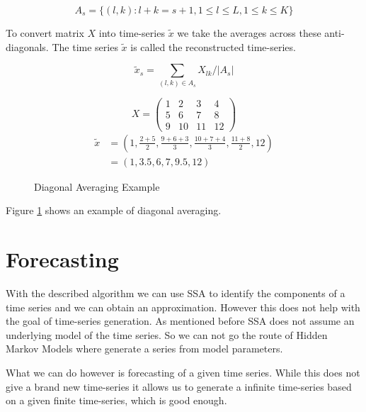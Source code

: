 \begin{equation}
A_{s}=\{(l, k): l+k=s+1,1 \leq l \leq L, 1 \leq k \leq K\}
\end{equation}

To convert matrix $X$ into time-series $\tilde{x}$ we take the averages across these anti-diagonals. The time series $\tilde{x}$ is called the reconstructed time-series. 

\begin{equation}
    \widetilde{x}_{s}=\sum_{(l, k) \in A_{s}} X_{l k} /\left|A_{s}\right|
\end{equation}


\begin{figure}
   \begin{equation*}
      X = 
      \begin{pmatrix}
         1 & 2 & 3 & 4 \\
         5 & 6 & 7 & 8 \\
         9 & 10 & 11 & 12
      \end{pmatrix}
   \end{equation*}
   \begin{equation*}
      \begin{aligned}
      \widetilde{x} &= (1, \frac{2+5}{2}, \frac{9 + 6 + 3}{3}, \frac{10 + 7 + 4}{3}, \frac{11 + 8}{2}, 12) \\
      &= (1, 3.5, 6, 7, 9.5, 12)
      \end{aligned}
   \end{equation*}
\caption{Diagonal Averaging Example}
\label{fig:diagonal-averaging}
\end{figure}

Figure \ref{fig:diagonal-averaging} shows an example of diagonal averaging. 

\section{Forecasting}

With the described algorithm we can use SSA to identify the components of a time series and we can obtain an approximation. However this does not help with the goal of time-series generation. As mentioned before SSA does not assume an underlying model of the time series. So we can not go the route of Hidden Markov Models where generate a series from model parameters. 

What we can do however is forecasting of a given time series. While this does not give a brand new time-series it allows us to generate a infinite time-series based on a given finite time-series, which is good enough. 

